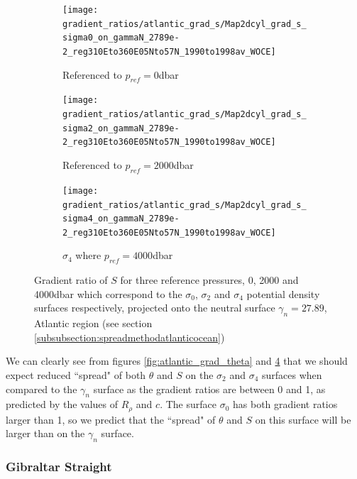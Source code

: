 \begin{figure}[htbp]
    \centering
     
     \begin{subfigure}{0.4\textwidth}
         
         \texttt{[image: gradient\_ratios/atlantic\_grad\_s/Map2dcyl\_grad\_s\_sigma0\_on\_gammaN\_2789e-2\_reg310Eto360E05Nto57N\_1990to1998av\_WOCE]}
         \caption{Referenced to $p_{ref} = 0$dbar}
         \label{fig:subplot_atlantic_grad_s_sig0}
     \end{subfigure}
     \begin{subfigure}{0.4\textwidth}
         
         \texttt{[image: gradient\_ratios/atlantic\_grad\_s/Map2dcyl\_grad\_s\_sigma2\_on\_gammaN\_2789e-2\_reg310Eto360E05Nto57N\_1990to1998av\_WOCE]}
         \caption{Referenced to $p_{ref} = 2000$dbar}
         \label{fig:subplot_atlantic_grad_s_sig2}
     \end{subfigure}
     
     \begin{subfigure}{0.4\textwidth}
         
         \texttt{[image: gradient\_ratios/atlantic\_grad\_s/Map2dcyl\_grad\_s\_sigma4\_on\_gammaN\_2789e-2\_reg310Eto360E05Nto57N\_1990to1998av\_WOCE]}
         \caption{$\sigma_4$ where $p_{ref} = 4000$dbar}
         \label{fig:subplot_atlantic_grad_s_sig4}
     \end{subfigure}
    \caption{Gradient ratio of $S$ for three reference pressures, 0, 2000 and 4000dbar which correspond to the $\sigma_0$, $\sigma_2$ and $\sigma_4$ potential density surfaces respectively, projected onto the neutral surface $\gamma_n = 27.89$, Atlantic region (see section \ref{subsubsection:spreadmethodatlanticocean})}
    \label{fig:atlantic_grad_s}
    
\end{figure}

We can clearly see from figures \ref{fig:atlantic_grad_theta} and \ref{fig:atlantic_grad_s} that we should expect reduced ``spread" of both $\theta$ and $S$ on the $\sigma_2$ and $\sigma_4$ surfaces when compared to the $\gamma_n$ surface as the gradient ratios are between 0 and 1, as predicted by the values of $R_\rho$ and $c$. The surface $\sigma_0$ has both gradient ratios larger than 1, so we predict that the ``spread" of $\theta$ and $S$ on this surface will be larger than on the $\gamma_n$ surface. 

\subsubsection{Gibraltar Straight}
\label{subsubseciton:gradientresultsGibraltar}


